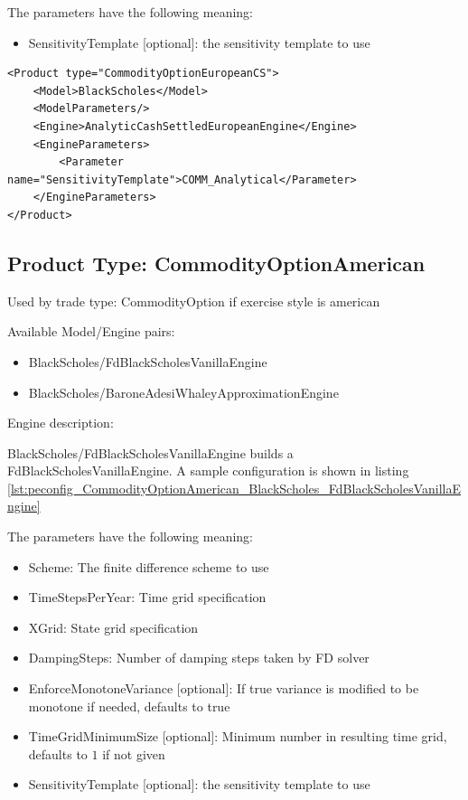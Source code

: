 The parameters have the following meaning:

\begin{itemize}
\item SensitivityTemplate [optional]: the sensitivity template to use
\end{itemize}

\begin{longlisting}
\begin{verbatim}
<Product type="CommodityOptionEuropeanCS">
    <Model>BlackScholes</Model>
    <ModelParameters/>
    <Engine>AnalyticCashSettledEuropeanEngine</Engine>
    <EngineParameters>
        <Parameter name="SensitivityTemplate">COMM_Analytical</Parameter>
    </EngineParameters>
</Product>
\end{verbatim}
\caption{Configuration for Product CommodityOptionEuropeanCS, Model BlackScholes, Engine AnalyticCashSettledEuropeanEngine}
\label{lst:peconfig_CommodityOptionEuropeanCS_BlackScholes_AnalyticCashSettledEuropeanEngine}
\end{longlisting}

\subsection{Product Type: CommodityOptionAmerican}

Used by trade type: CommodityOption if exercise style is american

Available Model/Engine pairs:

\begin{itemize}
\item BlackScholes/FdBlackScholesVanillaEngine
\item BlackScholes/BaroneAdesiWhaleyApproximationEngine
\end{itemize}

Engine description:

BlackScholes/FdBlackScholesVanillaEngine builds a FdBlackScholesVanillaEngine. A sample configuration is shown in listing
\ref{lst:peconfig_CommodityOptionAmerican_BlackScholes_FdBlackScholesVanillaEngine}

The parameters have the following meaning:

\begin{itemize}
\item Scheme: The finite difference scheme to use
\item TimeStepsPerYear: Time grid specification
\item XGrid: State grid specification
\item DampingSteps: Number of damping steps taken by FD solver
\item EnforceMonotoneVariance [optional]: If true variance is modified to be monotone if needed, defaults to true
\item TimeGridMinimumSize [optional]: Minimum number in resulting time grid, defaults to $1$ if not given
\item SensitivityTemplate [optional]: the sensitivity template to use
\end{itemize}

